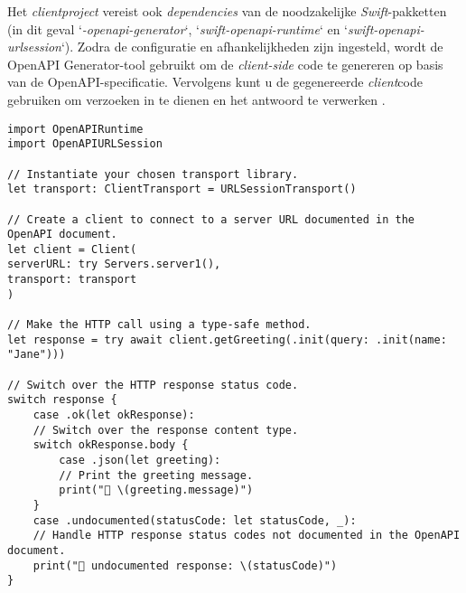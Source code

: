 Het \textit{clientproject} vereist ook \textit{dependencies} van de noodzakelijke \textit{Swift}-pakketten (in dit geval `\textit{-openapi-generator}`, `\textit{swift-openapi-runtime}` en `\textit{swift-openapi-urlsession}`). Zodra de configuratie en afhankelijkheden zijn ingesteld, wordt de OpenAPI Generator-tool gebruikt om de \textit{client-side} code te genereren op basis van de OpenAPI-specificatie. Vervolgens kunt u de gegenereerde \textit{client}code gebruiken om verzoeken in te dienen en het antwoord te verwerken \autocite{2024a}.
\begin{lstlisting}[caption=Using generated API Server Stubs]
import OpenAPIRuntime
import OpenAPIURLSession

// Instantiate your chosen transport library.
let transport: ClientTransport = URLSessionTransport()

// Create a client to connect to a server URL documented in the OpenAPI document.
let client = Client(
serverURL: try Servers.server1(),
transport: transport
)

// Make the HTTP call using a type-safe method.
let response = try await client.getGreeting(.init(query: .init(name: "Jane")))

// Switch over the HTTP response status code.
switch response {
    case .ok(let okResponse):
    // Switch over the response content type.
    switch okResponse.body {
        case .json(let greeting):
        // Print the greeting message.
        print("👋 \(greeting.message)")
    }
    case .undocumented(statusCode: let statusCode, _):
    // Handle HTTP response status codes not documented in the OpenAPI document.
    print("🥺 undocumented response: \(statusCode)")
}
\end{lstlisting}
